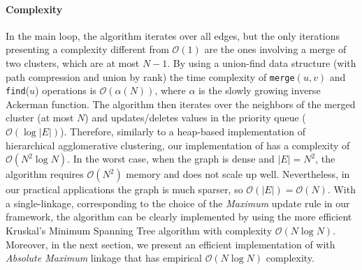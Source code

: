 \paragraph*{Complexity} In the main loop, the algorithm iterates over all edges, but the only iterations presenting a complexity different from $\mathcal{O}(1)$ are the ones involving a merge of two clusters, which are at most $N-1$. By using a union-find data structure (with path compression and union by rank) the time complexity of \texttt{merge}$(u, v)$ and \texttt{find}($u$) operations is $\mathcal{O}(\alpha(N))$, where $\alpha$ is the slowly growing inverse Ackerman function. The algorithm then iterates over the neighbors of the merged cluster (at most $N$) and updates/deletes values in the priority queue ($\mathcal{O}(\log |E|)$). Therefore, similarly to a heap-based implementation of hierarchical agglomerative clustering, our implementation of \algname{} has a complexity of $\mathcal{O}(N^2 \log N)$. In the worst case, when the graph is dense and $|E|=N^2$, the algorithm requires $\mathcal{O}(N^2)$ memory and does not scale up well. Nevertheless, in our practical applications the graph is much sparser, so $\mathcal{O}(|E|)=\mathcal{O}(N)$. 
With a single-linkage, corresponding to the choice of the \emph{Maximum} update rule in our framework, the algorithm can be clearly implemented by using the more efficient Kruskal's Minimum Spanning Tree algorithm with complexity $\mathcal{O}(N \log N)$. 
Moreover, in the next section, we present an efficient implementation of \algname{} with \emph{Absolute Maximum} linkage that has empirical $\mathcal{O}(N \log N)$ complexity.


